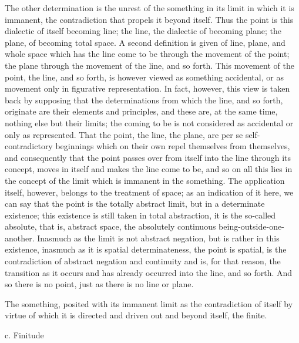 The other determination is the unrest of
the something in its limit in which it is immanent,
the contradiction that propels it beyond itself.
Thus the point is this dialectic of itself becoming line;
the line, the dialectic of becoming plane;
the plane, of becoming total space.
A second definition is given of line, plane, and whole space
which has the line come to be through the movement of the point;
the plane through the movement of the line, and so forth.
This movement of the point, the line, and so forth, is
however viewed as something accidental,
or as movement only in figurative representation.
In fact, however, this view is taken back by supposing that
the determinations from which the line, and so forth,
originate are their elements and principles,
and these are, at the same time,
nothing else but their limits;
the coming to be is not considered as accidental
or only as represented.
That the point, the line, the plane, are per se
self-contradictory beginnings which on their own
repel themselves from themselves,
and consequently that the point passes over
from itself into the line through its concept,
moves in itself and makes the line come to be,
and so on all this lies in the concept of the limit
which is immanent in the something.
The application itself, however,
belongs to the treatment of space;
as an indication of it here, we can say that
the point is the totally abstract limit,
but in a determinate existence;
this existence is still taken in total abstraction,
it is the so-called absolute, that is, abstract space,
the absolutely continuous being-outside-one-another.
Inasmuch as the limit is not abstract negation,
but is rather in this existence,
inasmuch as it is spatial determinateness,
the point is spatial, is the contradiction
of abstract negation and continuity
and is, for that reason, the transition
as it occurs and has already occurred
into the line, and so forth.
And so there is no point,
just as there is no line or plane.

The something, posited with its immanent limit
as the contradiction of itself by virtue of which
it is directed and driven out and beyond itself,
the finite.

c. Finitude

